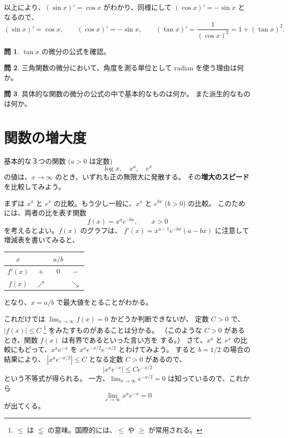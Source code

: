 \documentclass[a4paper]{jsarticle}
\theoremstyle{definition}
\newtheorem{Exercise}{問}%
\theoremstyle{remark}
\begin{document}
以上により、$(\sin x)' = \cos x$ がわかり、同様にして $(\cos x)' = -\sin
x$
となるので、
\[
(\sin x)' = \cos x,\qquad (\cos x)' = -\sin x,\qquad
(\tan x)' = \frac{1}{(\cos x)^2} = 1 + (\tan x)^2.
\]

\begin{Exercise}
$\tan x$ の微分の公式を確認。
\end{Exercise}

\begin{Exercise}
三角関数の微分において、角度を測る単位として radian を使う理由は何か。
\end{Exercise}

\begin{Exercise}
具体的な関数の微分の公式の中で基本的なものは何か。
また派生的なものは何か。
\end{Exercise}

\bigskip
\bigskip
\section{関数の増大度}
基本的な３つの関数 ($a>0$ は定数) 
\[
\log x,\quad x^a,\quad e^x 
\]
の値は、$x \to \infty$ のとき、いずれも正の無限大に発散する。
その{\bf 増大のスピード}%
を比較してみよう。

まずは $x^a$ と $e^x$ の比較。もう少し一般に、$x^a$ と $e^{bx}$
($b>0$) の比較。
このためには、両者の比を表す関数
\[
f(x) = x^ae^{-bx}, \qquad x > 0
\]
を考えるとよい。$f(x)$ のグラフは、
$f'(x) = x^{a-1}e^{-bx}(a-bx)$ に注意して
増減表を書いてみると、
\begin{center}
\begin{tabular}{|c|c|c|c|}
\hline
$x$ & & $a/b$ & \\
\hline
$f'(x)$ & $+$ & $0$ & $-$ \\
\hline
$f(x)$ & $\nearrow$ & & $\searrow$\\
\hline
\end{tabular}
\end{center}
となり、$x = a/b$ で最大値をとることがわかる。

\begin{figure}[htbp]
  \begin{center}

\end{center}
\caption{}
\end{figure}

これだけでは $\lim_{x\to \infty}f(x) = 0$ かどうか判断できないが、
定数 $C>0$ で、$|f(x)| \leq C$ \footnote{
  $\leq$ は $\leqq$ の意味。国際的には、$\leq$ や $\geq$ が常用される。}
をみたすものがあることは分かる。
（このような $C>0$ があるとき、関数 $f(x)$ は有界であるといった言い方を
する。）
さて、$x^a$ と $e^x$ の比較にもどって、$x^ae^{-x}$ を
$x^ae^{-x/2} e^{-x/2}$ とわけてみよう。
すると $b = 1/2$ の場合の結果により、
$|x^ae^{-x/2}| \leq C$ となる定数 $C>0$ があるので、
\[
|x^ae^{-x}| \leq C e^{-x/2}
\]
という不等式が得られる。
一方、$\lim_{x\to \infty}e^{-x/2} = 0$ は知っているので、これから
\[
\lim_{x\to \infty} x^ae^{-x} = 0
\]
が出てくる。
\end{document}
